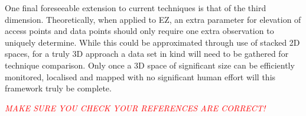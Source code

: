 \documentclass{UoYCSproject}
\begin{document}
            One final foreseeable extension to current techniques is that of the third dimension. Theoretically, when applied to EZ, an extra parameter for elevation of access points and data points should only require one extra observation to uniquely determine. While this could be approximated through use of stacked 2D spaces, for a truly 3D approach a data set in kind will need to be gathered for technique comparison. Only once a 3D space of significant size can be efficiently monitored, localised and mapped with no significant human effort will this framework truly be complete.
    
            \textcolor{red}{\emph{MAKE SURE YOU CHECK YOUR REFERENCES ARE CORRECT!}}
        
    
	
\end{document}
